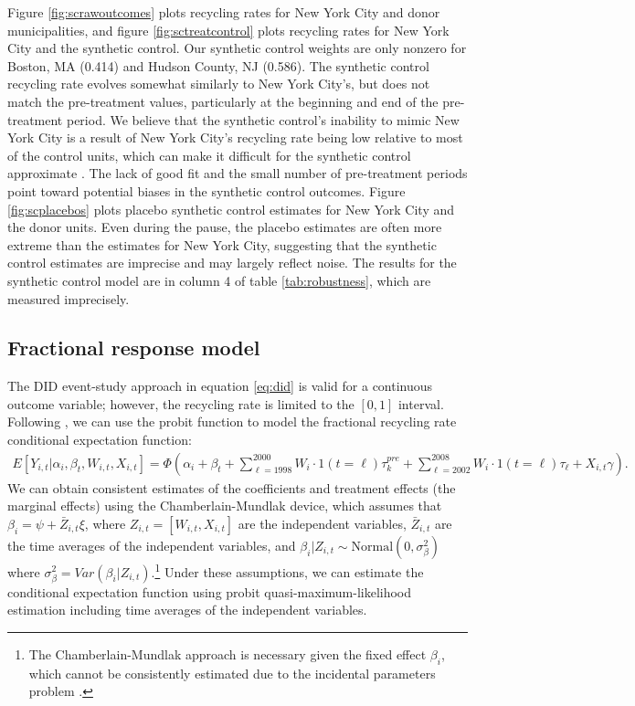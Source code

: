 \documentclass[12pt]{article}
\begin{document}
Figure \ref{fig:scrawoutcomes} plots recycling rates for New York City and donor municipalities, and figure \ref{fig:sctreatcontrol} plots recycling rates for New York City and the synthetic control.  Our synthetic control weights are only nonzero for Boston, MA (0.414) and Hudson County, NJ (0.586).  The synthetic control recycling rate evolves somewhat similarly to New York City's, but does not match the pre-treatment values, particularly at the beginning and end of the pre-treatment period.  We believe that the synthetic control's inability to mimic New York City is a result of New York City's recycling rate being low relative to most of the control units, which can make it difficult for the synthetic control approximate \citep{abadie2021}.  The lack of good fit and the small number of pre-treatment periods point toward potential biases in the synthetic control outcomes. Figure \ref{fig:scplacebos} plots placebo synthetic control estimates for New York City and the donor units.  Even during the pause, the placebo estimates are often more extreme than the estimates for New York City, suggesting that the synthetic control estimates are imprecise and may largely reflect noise.  The results for the synthetic control model are in column 4 of table \ref{tab:robustness}, which are measured imprecisely.

\subsection{Fractional response model}

The DID event-study approach in equation \ref{eq:did} is valid for a continuous outcome variable; however, the recycling rate is limited to the \([0,1]\) interval.  Following \cite{papkewooldridge2008}, we can use the probit function to model the fractional recycling rate conditional expectation function:
\begin{align} \label{eq:fracreg}
    E[Y_{i,t}|\alpha_i,\beta_t,W_{i,t},X_{i,t}] = \Phi\left(\alpha_i + \beta_t + \sum_{\ell = 1998}^{2000} W_{i} \cdot 1(t=\ell) \tau_k^{pre} +  \sum_{\ell=2002}^{2008} W_{i} \cdot 1(t=\ell) \tau_\ell + X_{i,t}\gamma\right).
\end{align}
We can obtain consistent estimates of the coefficients and treatment effects (the marginal effects) using the Chamberlain-Mundlak device, which assumes that \(\beta_i = \psi + \bar{Z}_{i,t}\xi\), where \(Z_{i,t}=[W_{i,t},X_{i,t}]\) are the independent variables, \(\bar{Z}_{i,t}\) are the time averages of the independent variables, and \(\beta_i|Z_{i,t} \sim \text{Normal}(0,\sigma^2_\beta)\) where \(\sigma^2_\beta = Var(\beta_i|Z_{i,t})\).\footnote{The Chamberlain-Mundlak approach is necessary given the fixed effect \(\beta_i\), which cannot be consistently estimated due to the incidental parameters problem \citep{wooldridge2010}.}  Under these assumptions, we can estimate the conditional expectation function using probit quasi-maximum-likelihood estimation including time averages of the independent variables.
\end{document}
